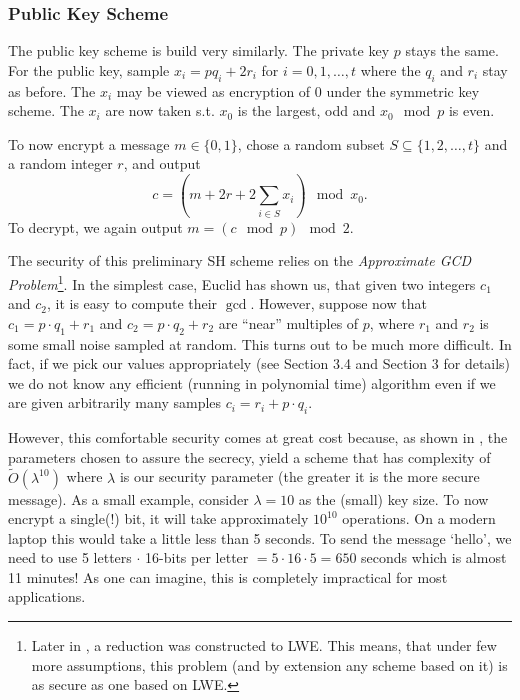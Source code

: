 \subsubsection*{Public Key Scheme}
The public key scheme is build very similarly. The private key $p$ stays the same. For the public key, sample $x_i = p q_i + 2r_i$ for $i = 0, 1, \dots, t$ where the $q_i$ and $r_i$ stay as before. The $x_i$ may be viewed as encryption of 0 under the symmetric key scheme. The $x_i$ are now taken s.t. $x_0$ is the largest, odd and $x_0 \mod p$ is even.

To now encrypt a message $m \in \{0,1\}$, chose a random subset $S \subseteq \{1, 2, \dots, t\}$ and a random integer $r$, and output
\begin{equation} c = (m + 2r + 2\sum_{i \in S} x_i) \mod x_0.\end{equation}
To decrypt, we again output $m = (c \mod p) \mod 2$.

The security of this preliminary SH scheme relies on the \textit{Approximate GCD Problem}\footnote{Later in \cite{revisited}, a reduction was constructed to LWE. This means, that under few more assumptions, this problem (and by extension any scheme based on it) is as secure as one based on LWE.}. In the simplest case, Euclid has shown us, that given two integers $c_1$ and $c_2$, it is easy to compute their $\gcd$. However, suppose now that $c_1 = p \cdot q_1 + r_1$ and $c_2 = p \cdot q_2 + r_2$ are ``near'' multiples of $p$, where $r_1$ and $r_2$ is some small noise sampled at random. This turns out to be much more difficult. In fact, if we pick our values appropriately (see \cite{easy_fhe} Section 3.4 and \cite{int_scheme} Section 3 for details) we do not know any efficient (running in polynomial time) algorithm even if we are given arbitrarily many samples $c_i = r_i + p \cdot q_i$.

However, this comfortable security comes at great cost because, as shown in \cite{int_scheme}, the parameters chosen to assure the secrecy, yield a scheme that has complexity of $\tilde{O}(\lambda^{10})$ where $\lambda$ is our security parameter (the greater it is the more secure message). As a small example, consider $\lambda = 10$ as the (small) key size. To now encrypt a single(!) bit, it will take approximately $10^{10}$ operations. On a modern laptop this would take a little less than 5 seconds. To send the message `hello', we need to use 5 letters $\cdot$ 16-bits per letter $= 5\cdot 16\cdot5 = 650$ seconds which is almost 11 minutes! As one can imagine, this is completely impractical for most applications.

